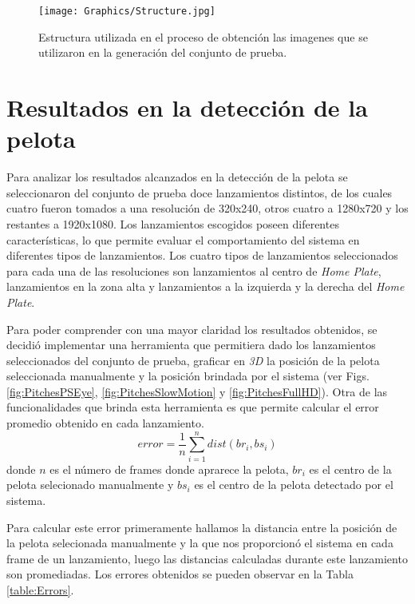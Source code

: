 \begin{figure}[!h]
    \centering
    \texttt{[image: Graphics/Structure.jpg]}
	\caption{Estructura utilizada en el proceso de obtención las imagenes que se utilizaron en la generación del conjunto de prueba.}
	\label{fig:Structure}
\end{figure}

\section{Resultados en la detección de la pelota}

Para analizar los resultados alcanzados en la detección de la pelota se seleccionaron del conjunto de prueba doce lanzamientos distintos, de los cuales cuatro fueron tomados a una resolución de 320x240, otros cuatro a 1280x720 y los restantes a 1920x1080. Los lanzamientos escogidos poseen diferentes características, lo que permite evaluar el comportamiento del sistema en diferentes tipos de lanzamientos. Los cuatro tipos de lanzamientos seleccionados para cada una de las resoluciones son lanzamientos al centro de \textit{Home Plate}, lanzamientos en la zona alta y lanzamientos a la izquierda y la derecha del \textit{Home Plate}.

Para poder comprender con una mayor claridad los resultados obtenidos, se decidió implementar una herramienta que permitiera dado los lanzamientos seleccionados del conjunto de prueba, graficar en \textit{3D} la posición de la pelota seleccionada manualmente y la posición brindada por el sistema (ver Figs. \ref{fig:PitchesPSEye}, \ref{fig:PitchesSlowMotion} y \ref{fig:PitchesFullHD}). Otra de las funcionalidades que brinda esta herramienta es que permite calcular el error promedio obtenido en cada lanzamiento.
$$error = \frac{1}{n} \sum_{i=1}^n dist(br_i, bs_i)$$
donde $n$ es el número de frames donde aprarece la pelota, $br_i$ es el centro de la pelota selecionado manualmente y $bs_i$ es el centro de la pelota detectado por el sistema.

Para calcular este error primeramente hallamos la distancia entre la posición de la pelota selecionada manualmente y la que nos proporcionó el sistema en cada frame de un lanzamiento, luego las distancias calculadas durante este lanzamiento son promediadas. Los errores obtenidos se pueden observar en la Tabla \ref{table:Errors}.

